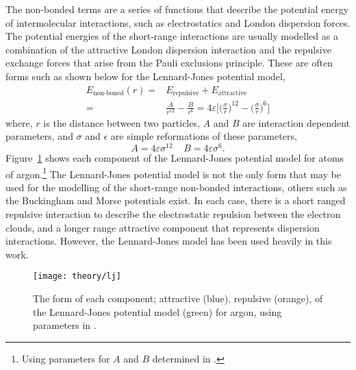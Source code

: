 The non-bonded terms are a series of functions that describe the potential energy of intermolecular interactions, such as electrostatics and London dispersion forces.
The potential energies of the short-range interactions are usually modelled as a combination of the attractive London dispersion interaction and the repulsive exchange forces that arise from the Pauli exclusions principle.\autocite{leach_molecular_1996}
These are often forms such as shown below for the Lennard-Jones potential model,\autocite{lennard-jones_determination_1924}
%
\begin{equation}
\begin{aligned}
  E_{\text{non-boned}}(r) = & E_{\text{repulsive}} + E_{\text{attractive}} \\
  = & \frac{A}{r^{12}} - \frac{B}{r^6} = 4\varepsilon\Bigg[\bigg(\frac{\sigma}{r}\bigg)^{12} - \bigg(\frac{\sigma}{r}\bigg)^6\Bigg]
\end{aligned}
\end{equation}
%
where, $r$ is the distance between two particles, $A$ and $B$ are interaction dependent parameters, and $\sigma$ and $\epsilon$ are simple reformations of these parameters,
%
\begin{equation}
  A = 4\varepsilon\sigma^{12} \;\;\;\; B = 4\varepsilon\sigma^6.
\end{equation}
%
Figure~\ref{fig:lj} shows each component of the Lennard-Jones potential model for atoms of argon.\footnote{Using parameters for $A$ and $B$ determined in \cite{rahman_correlations_1964}.}
The Lennard-Jones potential model is not the only form that may be used for the modelling of the short-range non-bonded interactions, others such as the Buckingham and Morse potentials exist.\autocite{buckingham_classical_1938, morse_diatomic_1929}
In each case, there is a short ranged repulsive interaction to describe the electrostatic repulsion between the electron clouds, and a longer range attractive component that represents dispersion interactions.
However, the Lennard-Jones model has been used heavily in this work.
%
\begin{figure}[t]
    \forceversofloat
    \centering
    \texttt{[image: theory/lj]}
    \caption{The form of each component; attractive (blue), repulsive (orange), of the Lennard-Jones potential model (green) for argon, using parameters in \cite{rahman_correlations_1964}.}
    \label{fig:lj}
\end{figure}
%

